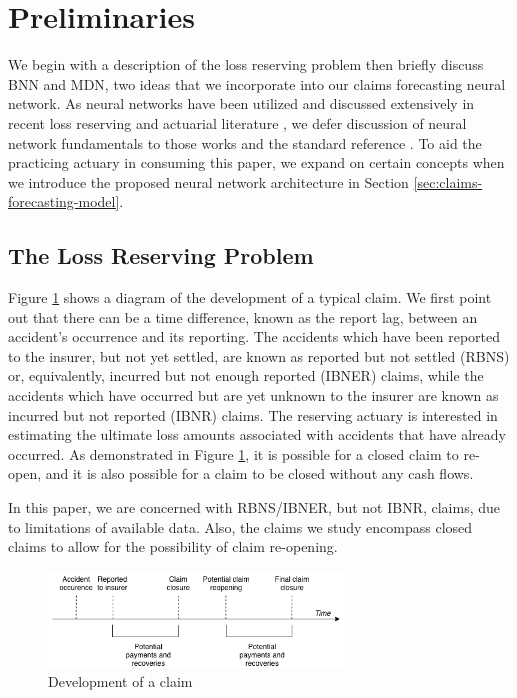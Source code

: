 \documentclass{article}
\begin{document}
\section{Preliminaries}

We begin with a description of the loss reserving problem then briefly discuss BNN and MDN, two ideas that we incorporate into our claims forecasting neural network. As neural networks have been utilized and discussed extensively in recent loss reserving and actuarial literature \cite{gabrielli2018neural, kuo2018deeptriangle, gabrielli2018individual, richman2018neural}, we defer discussion of neural network fundamentals to those works and the standard reference \cite{Goodfellow-et-al-2016}. To aid the practicing actuary in consuming this paper, we expand on certain concepts when we introduce the proposed neural network architecture in Section \ref{sec:claims-forecasting-model}.

\subsection{The Loss Reserving Problem}

Figure \ref{fig:claimrunoff} shows a diagram of the development of a typical claim. We first point out that there can be a time difference, known as the report lag, between an accident's occurrence and its reporting. The accidents which have been reported to the insurer, but not yet settled, are known as reported but not settled (RBNS) or, equivalently, incurred but not enough reported (IBNER) claims, while the accidents which have occurred but are yet unknown to the insurer are known as incurred but not reported (IBNR) claims. The reserving actuary is interested in estimating the ultimate loss amounts associated with accidents that have already occurred. As demonstrated in Figure \ref{fig:claimrunoff}, it is possible for a closed claim to re-open, and it is also possible for a claim to be closed without any cash flows.

In this paper, we are concerned with RBNS/IBNER, but not IBNR, claims, due to limitations of available data. Also, the claims we study encompass closed claims to allow for the possibility of claim re-opening.

\begin{figure}
  \begin{center}
    \includegraphics[width=0.7\textwidth]{images/claim_runoff.png}
  \end{center}
  \caption{Development of a claim}
  \label{fig:claimrunoff}
\end{figure}
\end{document}

